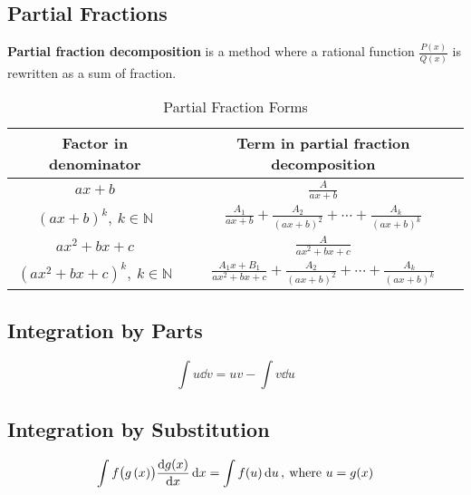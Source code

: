 \documentclass{article}
\begin{document}
\subsection{Partial Fractions}
\begin{definition}
    \textbf{Partial fraction decomposition} is a \linebreak method where a rational function $\displaystyle \frac{P(x)}{Q(x)}$ is rewritten as a sum of fraction.
\end{definition}
\begin{table}[H]
    \renewcommand*{\arraystretch}{1.5}
    \centering
    \begin{tabular}{c | c}
        \toprule
            \textbf{Factor in denominator} & \textbf{Term in partial fraction decomposition} \\
        \midrule
            $ax+b$ & $\displaystyle \frac{A}{ax+b}$ \\[10pt]
            $\left(ax+b\right)^k, \: k \in \mathbb{N}$ & $\displaystyle \frac{A_1}{ax+b} + \frac{A_2}{\left( ax+b \right)^2} + \cdots + \frac{A_k}{\left( ax+b \right)^k}$ \\[10pt]
            $ax^2+bx+c$ & $\displaystyle \frac{A}{ax^2+bx+c}$ \\[10pt]
            $\left(ax^2+bx+c\right)^k, \: k \in \mathbb{N}$ & $\displaystyle \frac{A_1x+B_1}{ax^2+bx+c} + \frac{A_2}{\left( ax+b \right)^2} + \cdots + \frac{A_k}{\left( ax+b \right)^k}$ \\[10pt]
        \bottomrule
    \end{tabular}
    \caption{Partial Fraction Forms}
\end{table}
\subsection{Integration by Parts}
\begin{theorem}
\begin{equation*}
    \int u \dd{v} = uv - \int v \dd{u}
\end{equation*}
\end{theorem}
\subsection{Integration by Substitution}
\begin{theorem}
    \begin{equation*}
        \int f\bigl(g\left( x \right)\bigr)\dv{g(x)}{x} \dd{x} = \int f(u) \dd{u}, \: \text{where } u = g(x)
    \end{equation*}
\end{theorem}
\end{document}

